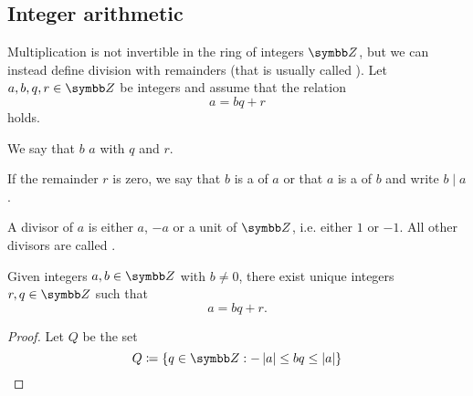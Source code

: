 \subsection{Integer arithmetic}\label{subsec:integer_arithmetic}

\begin{definition}\label{def:integer_division}\cite[1]{Knapp2016BAlg}
  Multiplication is not invertible in the ring of integers \( \Z \), but we can instead define division with remainders (that is usually called ). Let \( a, b, q, r \in \Z \) be integers and assume that the relation
  \begin{equation*}
    a = bq + r
  \end{equation*}
  holds.

  We say that \( b \)  \( a \) with  \( q \) and  \( r \).

  If the remainder \( r \) is zero, we say that \( b \) is a  of \( a \) or that \( a \) is a  of \( b \) and write \( b \mid a \).

  A  divisor of \( a \) is either \( a \), \( -a \) or a unit of \( \Z \), i.e. either \( 1 \) or \( -1 \). All other divisors are called .
\end{definition}

\begin{proposition}\label{thm:integer_division_algorithm}\cite[2]{Knapp2016BAlg}
  Given integers \( a, b \in \Z \) with \( b \neq 0 \), there exist unique integers \( r, q \in \Z \) such that
  \begin{equation*}
    a = bq + r.
  \end{equation*}
\end{proposition}
\begin{proof}
  Let \( Q \) be the set
  \begin{equation*}
    Q \coloneqq \{ q \in \Z : -\Abs{a} \leq bq \leq \Abs{a} \}
  \end{equation*}
\end{proof}
